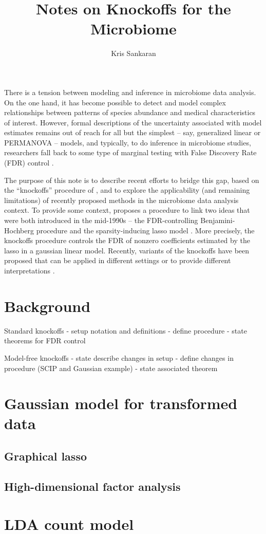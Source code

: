 \documentclass{article}
\title{Notes on Knockoffs for the Microbiome}
\author{Kris Sankaran}
\begin{document}
\maketitle

There is a tension between modeling and inference in microbiome data analysis.
On the one hand, it has become possible to detect and model complex
relationships between patterns of species abundance and medical characteristics
of interest. However, formal descriptions of the uncertainty associated with
model estimates remains out of reach for all but the simplest -- say,
generalized linear or PERMANOVA -- models, and typically, to
do inference in microbiome studies, researchers fall back to some type of
marginal testing with False Discovery Rate (FDR) control \citep{kelly2015power,
  mcmurdie2014waste, benjamini1995controlling, love2014moderated}.

The purpose of this note is to describe recent efforts to bridge this gap, based
on the ``knockoffs'' procedure of \citep{barber2015controlling}, and to explore
the applicability (and remaining limitations) of recently proposed methods in
the microbiome data analysis context. To provide some context,
\citep{barber2015controlling} proposes a procedure to link two ideas that were
both introduced in the mid-1990s -- the FDR-controlling Benjamini-Hochberg
procedure and the sparsity-inducing lasso model \citep{benjamini1995controlling,
  tibshirani1996regression}. More precisely, the knockoffs procedure controls
the FDR of nonzero coefficients estimated by the lasso in a gaussian linear
model. Recently, variants of the knockoffs have been proposed that can be
applied in different settings or to provide different interpretations
\citep{janson2016familywise, candes2016panning, katsevich2017multilayer,
  sesia2017gene, fan2017rank}.

\section{Background}
\label{sec:background}

Standard knockoffs
- setup notation and definitions
- define procedure
- state theorems for FDR control

Model-free knockoffs
- state describe changes in setup
- define changes in procedure (SCIP and Gaussian example)
- state associated theorem

\section{Gaussian model for transformed data}
\label{sec:mf_gaussian_model}

\subsection{Graphical lasso}
\label{subsec:graphical_lasso}


\subsection{High-dimensional factor analysis}
\label{subsec:factor_analysis}

\section{LDA count model}
\label{sec:lda_count_model}



\end{document}
